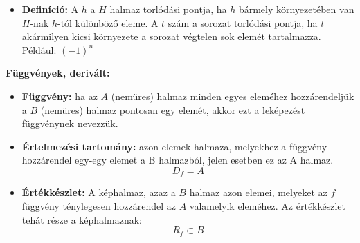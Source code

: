 \documentclass[12pt,a4paper]{article}
\begin{document}
\begin{tcolorbox}[colback=green!5!white,colframe=green!60!black,title= 5. Torlódási pont]
    \begin{itemize}
        \item \textbf{Definíció:} A \(h\) a \(H\) halmaz torlódási pontja, ha \(h\) bármely környezetében van \(H\)-nak \(h\)-tól
        különböző eleme. A \(t\) szám a sorozat torlódási pontja, ha \(t\) akármilyen kicsi környezete a sorozat végtelen sok
        elemét tartalmazza. Például: \((-1)^n\)
    \end{itemize}
\end{tcolorbox}
\newpage

\textbf{Függvények, derivált:}

\begin{tcolorbox}[colback=green!5!white,colframe=green!60!black,title= 1. Függvények{,} értelmezési tartomány{,} értékkészlet]
    \begin{itemize}
        \item \textbf{Függvény:} ha az \(A\) (nemüres) halmaz minden egyes eleméhez hozzárendeljük a \(B\)
        (nemüres) halmaz pontosan egy elemét, akkor ezt a leképezést függvénynek nevezzük.
        \item \textbf{Értelmezési tartomány:} azon elemek halmaza, melyekhez a függvény hozzárendel
        egy-egy elemet a B halmazból, jelen esetben ez az A halmaz.
        $$D_f = A$$
        \item \textbf{Értékkészlet:} A képhalmaz, azaz a \(B\) halmaz azon elemei, melyeket az \(f\) függvény
        ténylegesen hozzárendel az \(A\) valamelyik eleméhez. Az értékkészlet tehát része a képhalmaznak:
        $$R_f \subset B$$
    \end{itemize}
\end{tcolorbox}
\end{document}
